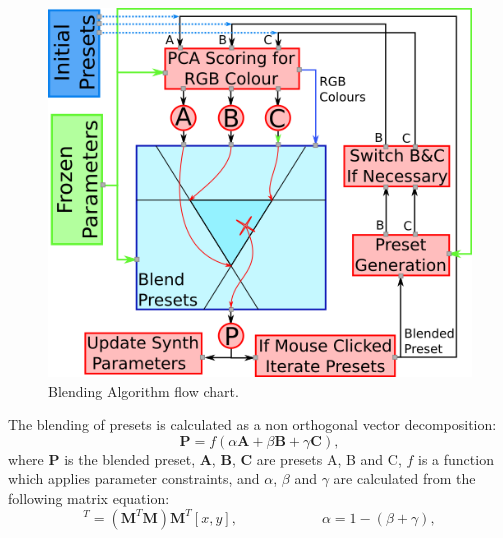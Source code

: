 \documentclass[11pt, oneside]{report}   	%
\renewcommand{\vec}[1]{\mathbf{#1}}
\begin{document}
\begin{figure}[h] 
	\centering
	\includegraphics[width = 5in]{BlendingAlgorithm.png}
	\caption{Blending Algorithm flow chart.}
	\label{fig:BlendingAlgorithm}
\end{figure}
%
The blending of presets is calculated as a non orthogonal vector decomposition: \cite{NonOrthogonal}
\begin{equation}
	\vec{P} = f(\alpha\vec{A} + \beta\vec{B} + \gamma\vec{C}),
	\label{eq:PresetMix}
\end{equation}
where $\vec{P}$ is the blended preset, $\vec{A}$, $\vec{B}$, $\vec{C}$ are presets A, B and C, $f$ is a function which applies parameter constraints, and $\alpha$, $\beta$ and $\gamma$ are calculated from the following matrix equation:
\begin{equation}
[\beta,  \gamma]^T = (\vec{M}^T\vec{M})\vec{M}^T[x, y], 
	\hspace{1in} \alpha = 1 - (\beta + \gamma),
\end{equation}
\end{document}
